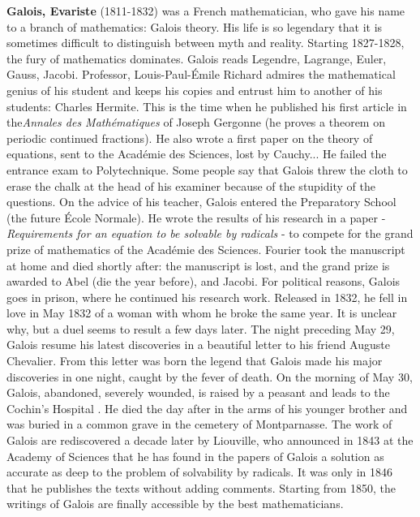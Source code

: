 \textbf{Galois, Evariste} (1811-1832) was a French mathematician, who gave his name to a branch of mathematics: Galois theory. His life is so legendary that it is sometimes difficult to distinguish between myth and reality. Starting 1827-1828, the fury of mathematics dominates. Galois reads Legendre, Lagrange, Euler, Gauss, Jacobi. Professor, Louis-Paul-Émile Richard admires the mathematical genius of his student and keeps his copies and entrust him to another of his students: Charles Hermite. This is the time when he published his first article in the\textit{Annales des Mathématiques} of Joseph Gergonne (he proves a theorem on periodic continued fractions). He also wrote a first paper on the theory of equations, sent to the Académie des Sciences, lost by Cauchy... He failed the entrance exam to Polytechnique. Some people say that Galois threw the cloth to erase the chalk at the head of his examiner because of the stupidity of the questions. On the advice of his teacher, Galois entered the Preparatory School (the future École Normale). He wrote the results of his research in a paper - \textit{Requirements for an equation to be solvable by radicals} - to compete for the grand prize of mathematics of the Académie des Sciences. Fourier took the manuscript at home and died shortly after: the manuscript is lost, and the grand prize is awarded to Abel (die the year before), and Jacobi. For political reasons, Galois goes in prison, where he continued his research work. Released in 1832, he fell in love in May 1832 of a woman with whom he broke the same year. It is unclear why, but a duel seems to result a few days later. The night preceding May 29, Galois resume his latest discoveries in a beautiful letter to his friend Auguste Chevalier. From this letter was born the legend that Galois made his major discoveries in one night, caught by the fever of death. On the morning of May 30, Galois, abandoned, severely wounded, is raised by a peasant and leads to the Cochin's Hospital . He died the day after in the arms of his younger brother and was buried in a common grave in the cemetery of Montparnasse. The work of Galois are rediscovered a decade later by Liouville, who announced in 1843 at the Academy of Sciences that he has found in the papers of Galois a solution as accurate as deep to the problem of solvability by radicals. It was only in 1846 that he publishes the texts without adding comments. Starting from 1850, the writings of Galois are finally accessible by the best mathematicians.


